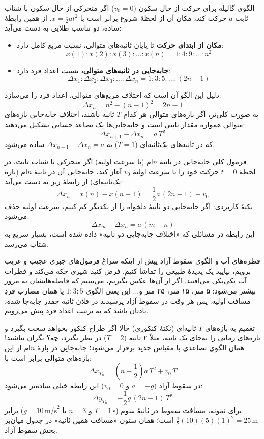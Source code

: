 \documentclass[12pt, a4paper]{article}
\begin{document}
\begin{conceptbox}{الگوی گالیله برای حرکت از حال سکون ($v_0 = 0$)}
اگر متحرکی از حال سکون با شتاب ثابت $a$ حرکت کند، مکان آن از لحظهٔ شروع برابر است با $x = \frac{1}{2}at^2$. از همین رابطهٔ ساده، دو تناسب طلایی به دست می‌آید:
\begin{itemize}
    \item \textbf{مکان از ابتدای حرکت} تا پایان ثانیه‌های متوالی، نسبت مربع کامل دارد:
    \[
    x(1) : x(2) : x(3) : \dots : x(n) = 1 : 4 : 9 : \dots : n^2
    \]
    \item \textbf{جابه‌جایی در ثانیه‌های متوالی،} نسبت اعداد فرد دارد:
    \[
    \Delta x_1 : \Delta x_2 : \Delta x_3 : \dots : \Delta x_n = 1 : 3 : 5 : \dots : (2n-1)
    \]
\end{itemize}
دلیل این الگو آن است که اختلاف مربع‌های متوالی، اعداد فرد را می‌سازد:
\[
\Delta x_n = n^2 - (n-1)^2 = 2n - 1
\]
به صورت کلی‌تر، اگر بازه‌های متوالی هر کدام $T$ ثانیه باشند، اختلاف جابه‌جایی بازه‌های متوالی همواره مقدار ثابتی است و جابه‌جایی‌ها یک تصاعد حسابی تشکیل می‌دهند:
\[
\Delta x_{n+1} - \Delta x_n = a\,T^2
\]
که در ثانیه‌های یک‌ثانیه‌ای ($T=1$) به $\Delta x_{n+1} - \Delta x_n = a$ ساده می‌شود.
\end{conceptbox}

\begin{conceptbox}{فرمول کلی جابه‌جایی در ثانیهٔ $n$‌ام (با سرعت اولیه)}
اگر متحرکی با شتاب ثابت، در لحظهٔ $t=0$ حرکت خود را با سرعت اولیهٔ $v_0$ آغاز کند، جابه‌جایی آن در ثانیهٔ $n$‌ام (بازهٔ یک‌ثانیه‌ای) از رابطهٔ زیر به دست می‌آید:
\[
\Delta x_n = x(n) - x(n-1) = \frac{1}{2}a\,(2n-1) + v_0
\]
نکتهٔ کاربردی: اگر جابه‌جایی دو ثانیهٔ دلخواه را از یکدیگر کم کنیم، سرعت اولیه حذف می‌شود:
\[
\Delta x_m - \Delta x_n = a\,(m-n)
\]
این رابطه در مسائلی که «اختلاف جابه‌جایی دو ثانیه» داده شده است، بسیار سریع به شتاب می‌رسد.
\end{conceptbox}

\begin{tipbox}{قطره‌های آب و الگوی سقوط آزاد}
پیش از اینکه سراغ فرمول‌های جبری عجیب و غریب برویم، بیایید یک پدیدهٔ طبیعی را تماشا کنیم. فرض کنید شیری چکه می‌کند و قطرات آب یکی‌یکی می‌افتند. اگر از آن‌ها عکس بگیریم، می‌بینیم که فاصله‌هایشان به مرور بیشتر می‌شود: ۵ متر، ۱۵ متر، ۲۵ متر و... این یعنی الگوی $1:3:5$ یا همان مضارب فردِ مسافت اولیه. پس هر وقت در سقوط آزاد پرسیدند در فلان ثانیه چقدر جابه‌جا شده، یادتان باشد که به ترتیب اعداد فرد پیش می‌رویم.
\end{tipbox}

\begin{tipbox}{تعمیم به بازه‌های $T$ ثانیه‌ای (نکتهٔ کنکوری)}
حالا اگر طراح کنکور بخواهد سخت بگیرد و بازه‌های زمانی را به‌جای یک ثانیه، مثلاً ۲ ثانیه ($T=2$) در نظر بگیرد، چه؟ نگران نباشید! همان الگوی تصاعدی با مقیاس جدید برقرار می‌شود؛ جابه‌جایی در بازهٔ $n$‌ام از این بازه‌های متوالی برابر است با:
\[
\Delta x_{T_n} = \left(n - \frac{1}{2}\right)a\,T^2 + v_0\,T
\]
در سقوط آزاد ($a = -g$ و $v_0 = 0$) این رابطه خیلی ساده‌تر می‌شود:
\[
\Delta y_{T_n} = -\frac{1}{2}g\,(2n-1)\,T^2
\]
برای نمونه، مسافت سقوط در ثانیهٔ سوم ($T = 1\,\text{s}$ و $n = 3$ با $g = 10\,\text{m/s}^2$) برابر $\frac{1}{2}(10)(5)(1)^2 = 25\,\text{m}$ است؛ همان ستون «مسافت همین ثانیه» در جدول میان‌بر بخش سقوط آزاد.
\end{tipbox}
\end{document}
